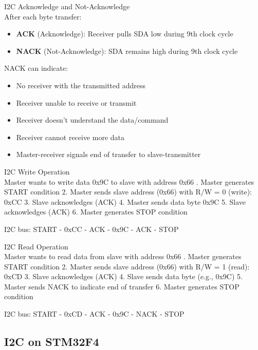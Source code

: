 \begin{concept}{I2C Acknowledge and Not-Acknowledge}\\
After each byte transfer:
\begin{itemize}
    \item \textbf{ACK} (Acknowledge): Receiver pulls SDA low during 9th clock cycle
    \item \textbf{NACK} (Not-Acknowledge): SDA remains high during 9th clock cycle
\end{itemize}
NACK can indicate:
\begin{itemize}
    \item No receiver with the transmitted address
    \item Receiver unable to receive or transmit
    \item Receiver doesn't understand the data/command
    \item Receiver cannot receive more data
    \item Master-receiver signals end of transfer to slave-transmitter
\end{itemize}
\end{concept}

\begin{example2}{I2C Write Operation}\\
Master wants to write data 0x9C to slave with address 0x66
. Master generates START condition
2. Master sends slave address (0x66) with R/W = 0 (write): 0xCC
3. Slave acknowledges (ACK)
4. Master sends data byte 0x9C
5. Slave acknowledges (ACK)
6. Master generates STOP condition

I2C bus:
START - 0xCC - ACK - 0x9C - ACK - STOP
\end{example2}

\begin{example2}{I2C Read Operation}\\
Master wants to read data from slave with address 0x66
. Master generates START condition
2. Master sends slave address (0x66) with R/W = 1 (read): 0xCD
3. Slave acknowledges (ACK)
4. Slave sends data byte (e.g., 0x9C)
5. Master sends NACK to indicate end of transfer
6. Master generates STOP condition

I2C bus:
START - 0xCD - ACK - 0x9C - NACK - STOP
\end{example2}

\subsection{I2C on STM32F4}

